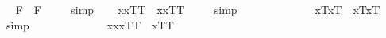 \begin{isabellebody}
%
\isadelimproof
%
\endisadelimproof
\isanewline
\ \isamarkupfalse%
\ {\isachardoublequoteopen}{\isacharbrackleft}\isactrlbold {\isasymdiamond}\isactrlbold {\isasymbox}{\isasymphi}\isactrlsup F\ \isactrlbold {\isasymrightarrow}\ \isactrlbold {\isasymbox}{\isasymphi}\isactrlsup F{\isacharbrackright}\ {\isacharequal}\ {\isasymtop}{\isachardoublequoteclose}%
\isadelimproof
\ %
\endisadelimproof
%
\isatagproof
{}\isamarkupfalse%
\ simp\ \isamarkupfalse%
%
\endisatagproof
{\isafoldproof}%
%
\isadelimproof
%
\endisadelimproof
%
\isamarkuptrue%
\ \isamarkupfalse%
\ {\isachardoublequoteopen}{\isacharbrackleft}{\isacharparenleft}\isactrlbold {\isasymforall}x{\isachardot}\isactrlbold {\isasymbox}{\isasymlbrace}x\isactrlsup T{\isacharcomma}{\isasymphi}\isactrlsup T{\isasymrbrace}{\isacharparenright}\ \isactrlbold {\isasymrightarrow}\ \isactrlbold {\isasymbox}{\isacharparenleft}\isactrlbold {\isasymforall}x{\isachardot}{\isasymlbrace}x\isactrlsup T{\isacharcomma}{\isasymphi}\isactrlsup T{\isasymrbrace}{\isacharparenright}{\isacharbrackright}\ {\isacharequal}\ {\isasymtop}{\isachardoublequoteclose}%
\isadelimproof
\ %
\endisadelimproof
%
\isatagproof
{}\isamarkupfalse%
\ simp\ \isamarkupfalse%
%
\endisatagproof
{\isafoldproof}%
%
\isadelimproof
%
\endisadelimproof
\ \ \ \ \ \ \ \ \ \isanewline
\ \isamarkupfalse%
\ {\isachardoublequoteopen}{\isacharbrackleft}{\isacharparenleft}\isactrlbold {\isasymforall}x{\isachardot}\isactrlbold {\isasymbox}{\isasymlparr}{\isasymphi}\isactrlsup T{\isacharcomma}x\isactrlsup T{\isasymrparr}{\isacharparenright}\ \isactrlbold {\isasymrightarrow}\ \isactrlbold {\isasymbox}{\isacharparenleft}\isactrlbold {\isasymforall}x{\isachardot}{\isasymlparr}{\isasymphi}\isactrlsup T{\isacharcomma}x\isactrlsup T{\isasymrparr}{\isacharparenright}{\isacharbrackright}\ {\isacharequal}\ {\isasymtop}{\isachardoublequoteclose}%
\isadelimproof
\ %
\endisadelimproof
%
\isatagproof
{}\isamarkupfalse%
\ simp\ \isamarkupfalse%
%
\endisatagproof
{\isafoldproof}%
%
\isadelimproof
%
\endisadelimproof
\ \ \ \ \ \ \ \ \ \isanewline
\isanewline
\ \isamarkupfalse%
\ {\isachardoublequoteopen}{\isacharbrackleft}{\isacharparenleft}\isactrlbold {\isasymforall}x{\isachardot}\isactrlbold {\isasymbox}{\isacharparenleft}\isactrlbold {\isasymforall}x{\isachardot}{\isasymlbrace}x\isactrlsup T{\isacharcomma}{\isasymphi}\isactrlsup T{\isasymrbrace}{\isacharparenright}\ \isactrlbold {\isasymrightarrow}\ \isactrlbold {\isasymbox}{\isasymlbrace}x\isactrlsup T{\isacharcomma}{\isasymphi}\isactrlsup T{\isasymrbrace}{\isacharparenright}{\isacharbrackright}\ {\isacharequal}\ {\isasymtop}{\isachardoublequoteclose}%

\end{isabellebody}
